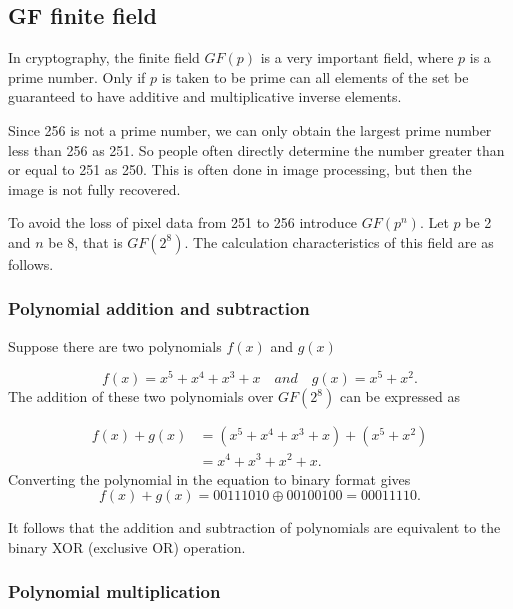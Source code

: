 \subsection{GF finite field}\label{(2,2)-VC}

In cryptography, the finite field $GF(p)$ is a very important field, where $p$ is a prime number. Only if $p$ is taken to be prime can all elements of the set be guaranteed to have additive and multiplicative inverse elements.

Since 256 is not a prime number, we can only obtain the largest prime number less than 256 as 251. So people often directly determine the number greater than or equal to 251 as 250. This is often done in image processing, but then the image is not fully recovered\cite{article13}.

To avoid the loss of pixel data from 251 to 256 introduce $GF(p^{n})$. Let $p$ be 2 and $n$ be 8, that is $GF (2^{8})$.
The calculation characteristics of this field are as follows.


\subsubsection{Polynomial addition and subtraction}\label{subsec_NC-BPDVC_framework}

Suppose there are two polynomials $f(x)$ and $g(x)$

\begin{equation}\label{eq1}
f(x)=x^{5}+x^{4}+x^{3}+x\quad and\quad g(x)=x^{5}+x^{2}.
\end{equation}
The addition of these two polynomials over $GF (2^{8})$ can be expressed as

\begin{equation}\label{eq1}
\begin{aligned}
f(x)+g(x) & =\left(x^{5}+x^{4}+x^{3}+x\right)+\left(x^{5}+x^{2}\right) \\
& =x^{4}+x^{3}+x^{2}+x.
\end{aligned}
\end{equation}Converting the polynomial in the equation to binary format gives
\begin{equation}\label{eq1}
f(x)+g(x)=00111010 \oplus 00100100=00011110.
\end{equation}

It follows that the addition and subtraction of polynomials are equivalent to the binary XOR (exclusive OR) operation.

\subsubsection{Polynomial multiplication}\label{subsec_NC-BPDVC_framework}

